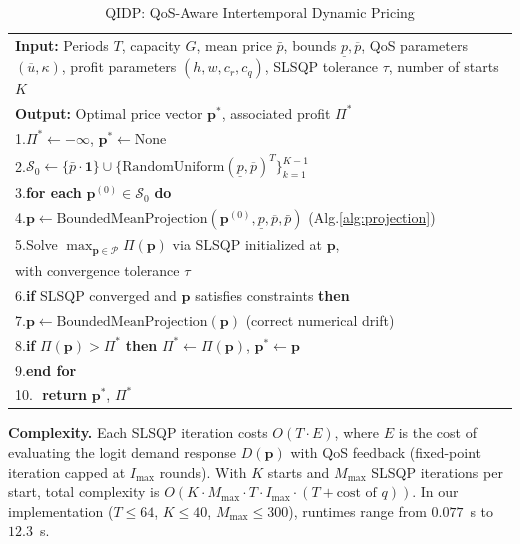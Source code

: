 \documentclass[11pt]{article}
\newcommand{\pcap}{\bar p}
\newcommand{\D}{D}
\begin{document}
\begin{table}[htbp]
\centering
\caption{QIDP: QoS-Aware Intertemporal Dynamic Pricing}
\label{alg:qidp}
\begin{tabular}{p{}}
\toprule
\textbf{Input:} Periods $T$, capacity $G$, mean price $\pcap$, bounds
$\underline p,\overline p$, QoS parameters $(\overline u,\kappa)$, profit
parameters $(h,w,c_r,c_q)$, SLSQP tolerance $\tau$, number of starts $K$ \\
\textbf{Output:} Optimal price vector $\boldsymbol{p}^*$, associated profit
$\Pi^*$ \\
\midrule
1.\quad $\Pi^*\leftarrow-\infty$, $\boldsymbol{p}^*\leftarrow\text{None}$ \\
2.\quad $\mathcal{S}_0\leftarrow\{\pcap\cdot\mathbf{1}\}\cup\{\text{RandomUniform}(\underline p,\overline p)^T\}_{k=1}^{K-1}$  \\
3.\quad \textbf{for each} $\boldsymbol{p}^{(0)}\in\mathcal{S}_0$ \textbf{do} \\
4.\quad\quad $\boldsymbol{p}\leftarrow\text{BoundedMeanProjection}(\boldsymbol{p}^{(0)},\underline p,\overline p,\pcap)$ (Alg.\ref{alg:projection}) \\
5.\quad\quad Solve $\max_{\boldsymbol{p}\in\mathcal{P}}\Pi(\boldsymbol{p})$ via SLSQP initialized at $\boldsymbol{p}$, \\
\quad\quad\quad with convergence tolerance $\tau$ \\
6.\quad\quad \textbf{if} SLSQP converged and $\boldsymbol{p}$ satisfies constraints \textbf{then} \\
7.\quad\quad\quad $\boldsymbol{p}\leftarrow\text{BoundedMeanProjection}(\boldsymbol{p})$ \quad (correct numerical drift) \\
8.\quad\quad\quad \textbf{if} $\Pi(\boldsymbol{p})>\Pi^*$ \textbf{then}
$\Pi^*\leftarrow\Pi(\boldsymbol{p})$, $\boldsymbol{p}^*\leftarrow\boldsymbol{p}$ \\
9.\quad \textbf{end for} \\
10.\,\, \textbf{return} $\boldsymbol{p}^*$, $\Pi^*$ \\
\bottomrule
\end{tabular}
\end{table}

\textbf{Complexity.} Each SLSQP iteration costs $O(T\cdot E)$, where $E$
is the cost of evaluating the logit demand response $\D(\boldsymbol{p})$
with QoS feedback (fixed-point iteration capped at $I_{\max}$ rounds). With
$K$ starts and $M_{\max}$ SLSQP iterations per start, total complexity is
$O(K \cdot M_{\max} \cdot T \cdot I_{\max} \cdot (T + \text{cost of }q))$.
In our implementation ($T\leq 64$, $K\leq 40$, $M_{\max}\leq 300$),
runtimes range from $0.077$~s to $12.3$~s.
\end{document}
